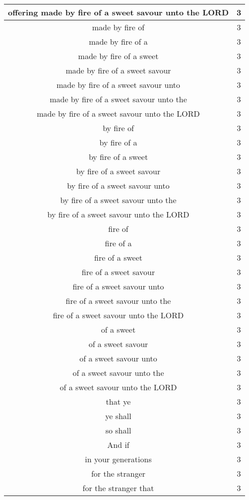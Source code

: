 \begin{center}
\begin{longtable}{|c|c|}
offering made by fire of a sweet savour unto the LORD & 3\\ \hline 
made by fire of & 3\\ \hline 
made by fire of a & 3\\ \hline 
made by fire of a sweet & 3\\ \hline 
made by fire of a sweet savour & 3\\ \hline 
made by fire of a sweet savour unto & 3\\ \hline 
made by fire of a sweet savour unto the & 3\\ \hline 
made by fire of a sweet savour unto the LORD & 3\\ \hline 
by fire of & 3\\ \hline 
by fire of a & 3\\ \hline 
by fire of a sweet & 3\\ \hline 
by fire of a sweet savour & 3\\ \hline 
by fire of a sweet savour unto & 3\\ \hline 
by fire of a sweet savour unto the & 3\\ \hline 
by fire of a sweet savour unto the LORD & 3\\ \hline 
fire of & 3\\ \hline 
fire of a & 3\\ \hline 
fire of a sweet & 3\\ \hline 
fire of a sweet savour & 3\\ \hline 
fire of a sweet savour unto & 3\\ \hline 
fire of a sweet savour unto the & 3\\ \hline 
fire of a sweet savour unto the LORD & 3\\ \hline 
of a sweet & 3\\ \hline 
of a sweet savour & 3\\ \hline 
of a sweet savour unto & 3\\ \hline 
of a sweet savour unto the & 3\\ \hline 
of a sweet savour unto the LORD & 3\\ \hline 
that ye & 3\\ \hline 
ye shall & 3\\ \hline 
so shall & 3\\ \hline 
And if & 3\\ \hline 
in your generations & 3\\ \hline 
for the stranger & 3\\ \hline 
for the stranger that & 3\\ \hline 

\end{longtable}
\end{center}
